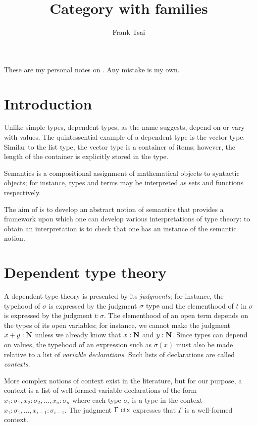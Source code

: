 \documentclass[a4paper]{article}
\title{Category with families}
\author{Frank Tsai}
\begin{document}
\maketitle

These are my personal notes on \cite{Hofmann1997}.
Any mistake is my own.

\section{Introduction}\label{sec:intro}

Unlike simple types, dependent types, as the name suggests, depend on or vary with values.
The quintessential example of a dependent type is the vector type.
Similar to the list type, the vector type is a container of items; however, the length of the container is explicitly stored in the type.

Semantics is a compositional assignment of mathematical objects to syntactic objects; for instance, types and terms may be interpreted as sets and functions respectively.

The aim of \cite{Hofmann1997} is to develop an abstract notion of semantics that provides a framework upon which one can develop various interpretations of type theory: to obtain an interpretation is to check that one has an instance of the semantic notion.

\section{Dependent type theory}\label{sec:dtt}

A dependent type theory is presented by its \emph{judgments}; for instance, the typehood of $\sigma$ is expressed by the judgment $\sigma~\mathrm{type}$ and the elementhood of $t$ in $\sigma$ is expressed by the judgment $t : \sigma$.
The elementhood of an open term depends on the types of its open variables; for instance, we cannot make the judgment $x + y : \mathbf{N}$ unless we already know that $x : \mathbf{N}$ and $y : \mathbf{N}$.
Since types can depend on values, the typehood of an expression such as $\sigma(x)$ must also be made relative to a list of \emph{variable declarations}.
Such lists of declarations are called \emph{contexts}.

More complex notions of context exist in the literature, but for our purpose, a context is a list of well-formed variable declarations of the form $x_1 : \sigma_1, x_2 : \sigma_2, \ldots, x_n : \sigma_n$ where each type $\sigma_i$ is a type in the context $x_1 : \sigma_1,\ldots, x_{i-1} : \sigma_{i-1}$.
The judgment $\Gamma~\mathrm{ctx}$ expresses that $\Gamma$ is a well-formed context.
\end{document}
